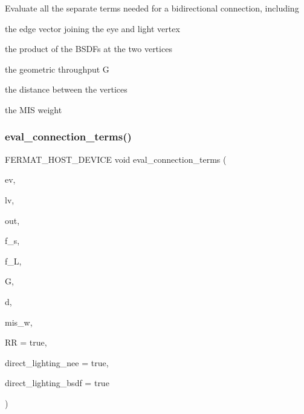 \begin{DoxyParagraph}{}
Evaluate all the separate terms needed for a bidirectional connection, including ~\newline

\begin{DoxyItemize}
\item the edge vector joining the eye and light vertex
\item the product of the B\+S\+D\+Fs at the two vertices
\item the geometric throughput G
\item the distance between the vertices
\item the M\+IS weight 
\end{DoxyItemize}
\end{DoxyParagraph}
\mbox{\label{group___b_p_t_lib_core_ga4aa55c80f176afb93197d76f8eb77751}} 
\subsubsection{\texorpdfstring{eval\+\_\+connection\+\_\+terms()}{eval\_connection\_terms()}\hspace{0.1cm}{\footnotesize\ttfamily [3/3]}}
{\footnotesize\ttfamily F\+E\+R\+M\+A\+T\+\_\+\+H\+O\+S\+T\+\_\+\+D\+E\+V\+I\+CE void eval\+\_\+connection\+\_\+terms (\begin{DoxyParamCaption}\item[{const \hyperlink{struct_eye_vertex}{Eye\+Vertex}}]{ev,  }\item[{const \hyperlink{struct_light_vertex}{Light\+Vertex} \&}]{lv,  }\item[{\hyperlink{structcugar_1_1_vector}{cugar\+::\+Vector3f} \&}]{out,  }\item[{\hyperlink{structcugar_1_1_vector}{cugar\+::\+Vector3f} \&}]{f\+\_\+s,  }\item[{\hyperlink{structcugar_1_1_vector}{cugar\+::\+Vector3f} \&}]{f\+\_\+L,  }\item[{float \&}]{G,  }\item[{float \&}]{d,  }\item[{float \&}]{mis\+\_\+w,  }\item[{bool}]{RR = {\ttfamily true},  }\item[{bool}]{direct\+\_\+lighting\+\_\+nee = {\ttfamily true},  }\item[{bool}]{direct\+\_\+lighting\+\_\+bsdf = {\ttfamily true} }\end{DoxyParamCaption})\hspace{0.3cm}{\ttfamily [inline]}}


